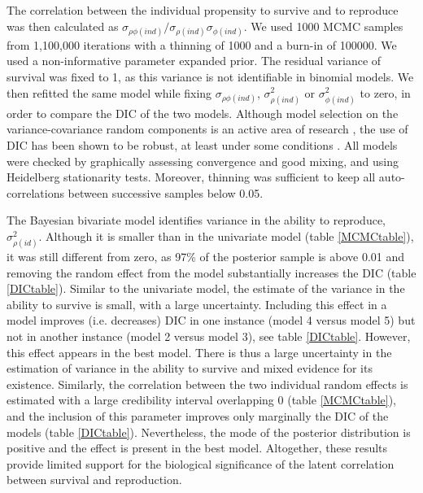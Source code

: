 The correlation between the individual propensity to survive and to reproduce was then calculated as $\sigma_{\rho \phi (ind)} /	\sigma_{\rho (ind)} \sigma_{\phi (ind)} $.
We used 1000 MCMC samples from 1,100,000 iterations with a thinning of 1000 and a burn-in of 100000. We used a non-informative parameter expanded prior. The residual variance of survival was fixed to 1, as this variance is not identifiable in binomial models.
We then refitted the same model while fixing $\sigma_{\rho \phi (ind)}$, $\sigma_{\rho (ind)}^2$ or $\sigma_{\phi (ind)}^2$ to zero, in order to compare the DIC of the two models. Although model selection on the variance-covariance random components is an active area of research \parencite[e.g.][chapter 6]{Burnham2002c}, the use of DIC has been shown to be robust, at least under some conditions \parencite{Wilberg2008,Barnett2010}.
All models were checked by graphically assessing convergence and good mixing, and using Heidelberg stationarity tests. Moreover, thinning was sufficient to keep all auto-correlations between successive samples below 0.05. 

The Bayesian bivariate model identifies variance in the ability to reproduce, $\sigma_{\rho (id)}^2$. Although it is smaller than in the univariate model (table \ref{MCMCtable}), it was still different from zero, as 97\% of the posterior sample is above 0.01 and removing the random effect from the model substantially increases the DIC (table \ref{DICtable}).
Similar to the univariate model, the estimate of the variance in the ability to survive is small, with a large uncertainty. Including this effect in a model improves (i.e. decreases) DIC in one instance (model 4 versus model 5) but not in another instance (model 2 versus model 3), see table \ref{DICtable}. However, this effect appears in the best model. There is thus a large uncertainty in the estimation of variance in the ability to survive and mixed evidence for its existence.
Similarly, the correlation between the two individual random effects is estimated with a large credibility interval overlapping 0 (table \ref{MCMCtable}), and the inclusion of this parameter improves only marginally the DIC of the models (table \ref{DICtable}). Nevertheless, the mode of the posterior distribution is positive and the effect is present in the best model. Altogether, these results provide limited support for the biological significance of the latent correlation between survival and reproduction.

